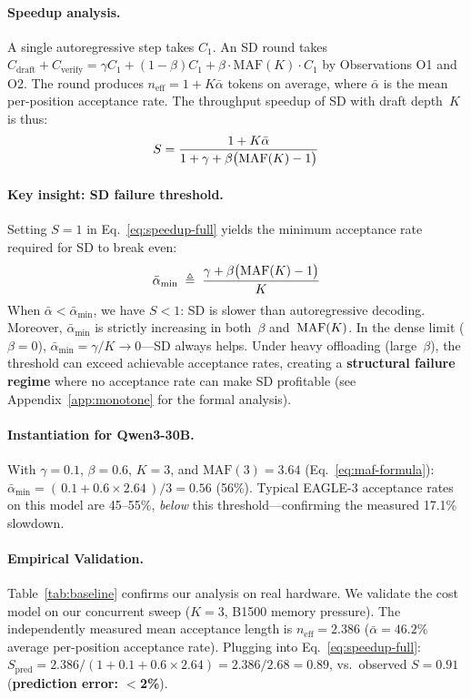 \documentclass[letterpaper,twocolumn,10pt]{article}
\newcommand{\thetabar}{\bar{\alpha}}
\begin{document}
\paragraph{Speedup analysis.}
A single autoregressive step takes $C_1$.  An SD round takes
$C_{\text{draft}} + C_{\text{verify}} = \gamma C_1 + (1\!-\!\beta)C_1
+ \beta\cdot\text{MAF}(K)\cdot C_1$ by Observations O1 and O2.
The round produces $n_{\text{eff}} = 1 + K\thetabar$ tokens on average,
where $\thetabar$ is the mean per-position acceptance rate.  The
throughput speedup of SD with draft depth~$K$ is thus:
\begin{equation}\label{eq:speedup-full}
    S = \frac{1 + K\thetabar}
                {1 + \gamma + \beta\bigl(\textup{MAF}(K) - 1\bigr)}
\end{equation}

\paragraph{Key insight: SD failure threshold.}
Setting $S = 1$ in Eq.~\eqref{eq:speedup-full} yields the minimum
acceptance rate required for SD to break even:
\begin{equation}\label{eq:breakeven}
    \thetabar_{\min}
     \;\triangleq\;
     \frac{\gamma + \beta\bigl(\textup{MAF}(K) - 1\bigr)}{K}
\end{equation}
When $\thetabar < \thetabar_{\min}$, we have $S < 1$: SD is slower than
autoregressive decoding.  Moreover, $\thetabar_{\min}$ is strictly
increasing in both~$\beta$ and~$\textup{MAF}(K)$.  In the dense limit
($\beta\!=\!0$), $\thetabar_{\min} = \gamma/K \to 0$---SD always helps.
Under heavy offloading (large~$\beta$), the threshold can exceed
achievable acceptance rates, creating a \textbf{structural failure regime}
where no acceptance rate can make SD profitable
(see Appendix~\ref{app:monotone} for the formal analysis).

\paragraph{Instantiation for Qwen3-30B.}
With $\gamma\!=\!0.1$, $\beta\!=\!0.6$, $K\!=\!3$, and
$\text{MAF}(3)\!=\!3.64$ (Eq.~\eqref{eq:maf-formula}):
$\thetabar_{\min}\!=\!(\,0.1+0.6 \times 2.64\,)/3 = 0.56$ (56\%).
Typical EAGLE-3 acceptance rates on this model are 45--55\%,
\emph{below} this threshold---confirming the measured 17.1\% slowdown.

\paragraph{Empirical Validation.}
Table~\ref{tab:baseline} confirms our analysis on real hardware.
We validate the cost model on our concurrent sweep ($K\!=\!3$,
B1500 memory pressure).  The independently measured mean acceptance
length is $n_\text{eff}\!=\!2.386$ ($\thetabar\!=\!46.2\%$ average
per-position acceptance rate).  Plugging into
Eq.~\eqref{eq:speedup-full}:
$S_{\text{pred}}=2.386/(1+0.1+0.6\times 2.64) = 2.386/2.68=0.89$,
vs.\ observed $S\!=\!0.91$
(\textbf{prediction error: $<$2\%}).
\end{document}
